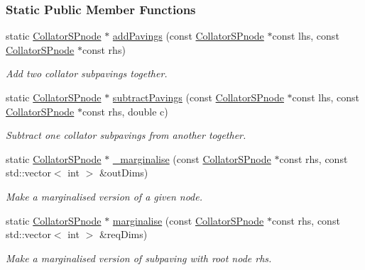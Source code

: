 \subsubsection*{\-Static \-Public \-Member \-Functions}
\begin{DoxyCompactItemize}
\item 
static \hyperlink{classsubpavings_1_1CollatorSPnode}{\-Collator\-S\-Pnode} $\ast$ \hyperlink{classsubpavings_1_1CollatorSPnode_a66a0f1bc3a886c904f8192774b531437}{add\-Pavings} (const \hyperlink{classsubpavings_1_1CollatorSPnode}{\-Collator\-S\-Pnode} $\ast$const lhs, const \hyperlink{classsubpavings_1_1CollatorSPnode}{\-Collator\-S\-Pnode} $\ast$const rhs)
\begin{DoxyCompactList}\small\item\em \-Add two collator subpavings together. \end{DoxyCompactList}\item 
static \hyperlink{classsubpavings_1_1CollatorSPnode}{\-Collator\-S\-Pnode} $\ast$ \hyperlink{classsubpavings_1_1CollatorSPnode_a79e263c5e6b22baeb2f4e543f33f6d5e}{subtract\-Pavings} (const \hyperlink{classsubpavings_1_1CollatorSPnode}{\-Collator\-S\-Pnode} $\ast$const lhs, const \hyperlink{classsubpavings_1_1CollatorSPnode}{\-Collator\-S\-Pnode} $\ast$const rhs, double c)
\begin{DoxyCompactList}\small\item\em \-Subtract one collator subpavings from another together. \end{DoxyCompactList}\item 
static \hyperlink{classsubpavings_1_1CollatorSPnode}{\-Collator\-S\-Pnode} $\ast$ \hyperlink{classsubpavings_1_1CollatorSPnode_ae156be7c91a97c25628edc6fcf00e1f9}{\-\_\-marginalise} (const \hyperlink{classsubpavings_1_1CollatorSPnode}{\-Collator\-S\-Pnode} $\ast$const rhs, const std\-::vector$<$ int $>$ \&out\-Dims)
\begin{DoxyCompactList}\small\item\em \-Make a marginalised version of a given node. \end{DoxyCompactList}\item 
static \hyperlink{classsubpavings_1_1CollatorSPnode}{\-Collator\-S\-Pnode} $\ast$ \hyperlink{classsubpavings_1_1CollatorSPnode_aec7d6bcee79660a09914100f9b878611}{marginalise} (const \hyperlink{classsubpavings_1_1CollatorSPnode}{\-Collator\-S\-Pnode} $\ast$const rhs, const std\-::vector$<$ int $>$ \&req\-Dims)
\begin{DoxyCompactList}\small\item\em \-Make a marginalised version of subpaving with root node {\itshape rhs\/}. \end{DoxyCompactList}\end{DoxyCompactItemize}
